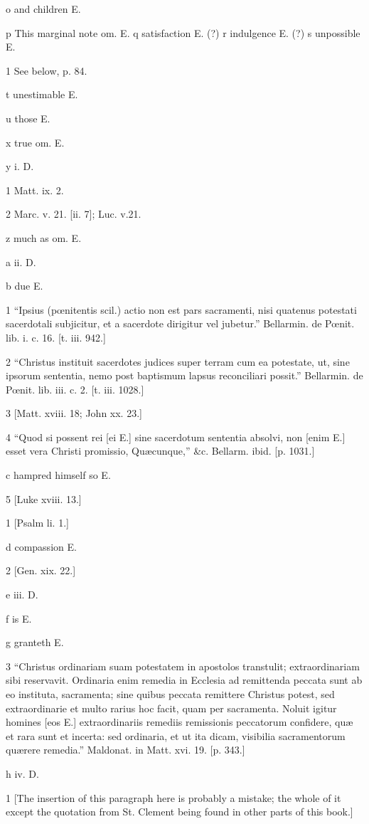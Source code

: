 o
and children E.

p This marginal note om. E.
q satisfaction E. (?)
r indulgence E. (?)
s
unpossible E.

1
See below, p. 84.

t
unestimable E.

u
those E.

x
true om. E.

y
i. D.

1
Matt. ix. 2.

2
Marc. v. 21. [ii. 7]; Luc. v.21.

z
much as om. E.

a
ii. D.

b
due E.

1
“Ipsius (pœnitentis scil.) actio non est pars sacramenti, nisi quatenus potestati sacerdotali subjicitur, et a sacerdote dirigitur vel jubetur.” Bellarmin. de Pœnit. lib. i. c. 16. [t. iii. 942.]

2
“Christus instituit sacerdotes judices super terram cum ea potestate, ut, sine ipsorum sententia, nemo post baptismum lapsus reconciliari possit.” Bellarmin. de Pœnit. lib. iii. c. 2. [t. iii. 1028.]

3
[Matt. xviii. 18; John xx. 23.]

4
“Quod si possent rei [ei E.] sine sacerdotum sententia absolvi, non [enim E.] esset vera Christi promissio, Quæcunque,” &c. Bellarm. ibid. [p. 1031.]

c
hampred himself so E.

5
[Luke xviii. 13.]

1
[Psalm li. 1.]

d
compassion E.

2
[Gen. xix. 22.]

e
iii. D.

f
is E.

g
granteth E.

3
“Christus ordinariam suam potestatem in apostolos transtulit; extraordinariam sibi reservavit. Ordinaria enim remedia in Ecclesia ad remittenda peccata sunt ab eo instituta, sacramenta; sine quibus peccata remittere Christus potest, sed extraordinarie et multo rarius hoc facit, quam per sacramenta. Noluit igitur homines [eos E.] extraordinariis remediis remissionis peccatorum confidere, quæ et rara sunt et incerta: sed ordinaria, et ut ita dicam, visibilia sacramentorum quærere remedia.” Maldonat. in Matt. xvi. 19. [p. 343.]

h
iv. D.

1
[The insertion of this paragraph here is probably a mistake; the whole of it except the quotation from St. Clement being found in other parts of this book.]

